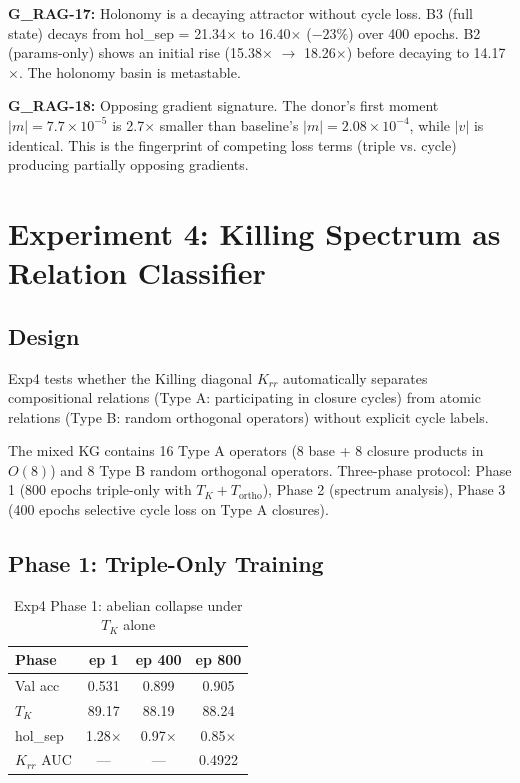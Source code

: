 \documentclass[11pt,letterpaper]{article}
\begin{document}
\textbf{G\_RAG-17:} Holonomy is a decaying attractor without cycle loss. B3 (full state) decays from hol\_sep = 21.34$\times$ to 16.40$\times$ ($-23\%$) over 400 epochs. B2 (params-only) shows an initial rise (15.38$\times$ $\to$ 18.26$\times$) before decaying to 14.17$\times$. The holonomy basin is metastable.

\textbf{G\_RAG-18:} Opposing gradient signature. The donor's first moment $|m| = 7.7 \times 10^{-5}$ is 2.7$\times$ smaller than baseline's $|m| = 2.08 \times 10^{-4}$, while $|v|$ is identical. This is the fingerprint of competing loss terms (triple vs. cycle) producing partially opposing gradients.

\section{Experiment 4: Killing Spectrum as Relation Classifier}

\subsection{Design}

Exp4 tests whether the Killing diagonal $K_{rr}$ automatically separates compositional relations (Type A: participating in closure cycles) from atomic relations (Type B: random orthogonal operators) without explicit cycle labels.

The mixed KG contains 16 Type A operators (8 base + 8 closure products in $O(8)$) and 8 Type B random orthogonal operators. Three-phase protocol: Phase 1 (800 epochs triple-only with $T_K + T_{\text{ortho}}$), Phase 2 (spectrum analysis), Phase 3 (400 epochs selective cycle loss on Type A closures).

\subsection{Phase 1: Triple-Only Training}

\begin{table}[H]
\centering
\caption{Exp4 Phase 1: abelian collapse under $T_K$ alone}
\begin{tabular}{@{}lccc@{}}
\toprule
\textbf{Phase} & \textbf{ep 1} & \textbf{ep 400} & \textbf{ep 800} \\
\midrule
Val acc & 0.531 & 0.899 & 0.905 \\
$T_K$ & 89.17 & 88.19 & 88.24 \\
hol\_sep & 1.28$\times$ & 0.97$\times$ & 0.85$\times$ \\
$K_{rr}$ AUC & --- & --- & 0.4922 \\
\bottomrule
\end{tabular}
\end{table}
\end{document}
